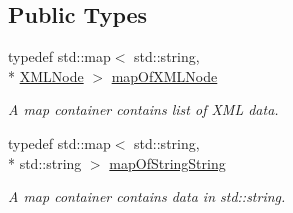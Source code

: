 \subsection*{Public Types}
\begin{DoxyCompactItemize}
\item 
typedef std\-::map$<$ std\-::string, \\*
\hyperlink{structXMLNode}{X\-M\-L\-Node} $>$ \hyperlink{classunisys_1_1PSIMI_a0cc51198d3cd685cfa21a42c5dc0ee7f}{map\-Of\-X\-M\-L\-Node}
\begin{DoxyCompactList}\small\item\em A map container contains list of X\-M\-L data. \end{DoxyCompactList}\item 
typedef std\-::map$<$ std\-::string, \\*
std\-::string $>$ \hyperlink{classunisys_1_1PSIMI_acf60eee34b73f37af16a0aea2aecebd3}{map\-Of\-String\-String}
\begin{DoxyCompactList}\small\item\em A map container contains data in std\-::string. \end{DoxyCompactList}\end{DoxyCompactItemize}
